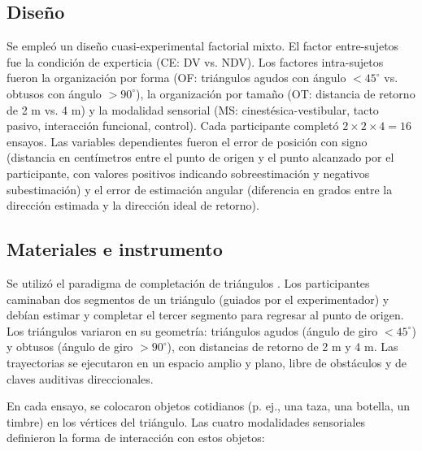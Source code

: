 \documentclass[12pt,letterpaper]{article}
\begin{document}
\subsection{Diseño}

Se empleó un diseño cuasi-experimental factorial mixto. El factor entre-sujetos fue la condición de experticia (CE: DV vs. NDV). Los factores intra-sujetos fueron la organización por forma (OF: triángulos agudos con ángulo $< 45^{\circ}$ vs. obtusos con ángulo $> 90^{\circ}$), la organización por tamaño (OT: distancia de retorno de 2 m vs. 4 m) y la modalidad sensorial (MS: cinestésica-vestibular, tacto pasivo, interacción funcional, control). Cada participante completó $2 \times 2 \times 4 = 16$ ensayos. Las variables dependientes fueron el error de posición con signo (distancia en centímetros entre el punto de origen y el punto alcanzado por el participante, con valores positivos indicando sobreestimación y negativos subestimación) y el error de estimación angular (diferencia en grados entre la dirección estimada y la dirección ideal de retorno).

\subsection{Materiales e instrumento}

Se utilizó el paradigma de completación de triángulos \parencite{McLaren2022}. Los participantes caminaban dos segmentos de un triángulo (guiados por el experimentador) y debían estimar y completar el tercer segmento para regresar al punto de origen. Los triángulos variaron en su geometría: triángulos agudos (ángulo de giro $< 45^{\circ}$) y obtusos (ángulo de giro $> 90^{\circ}$), con distancias de retorno de 2 m y 4 m. Las trayectorias se ejecutaron en un espacio amplio y plano, libre de obstáculos y de claves auditivas direccionales.

En cada ensayo, se colocaron objetos cotidianos (p. ej., una taza, una botella, un timbre) en los vértices del triángulo. Las cuatro modalidades sensoriales definieron la forma de interacción con estos objetos:
\end{document}
